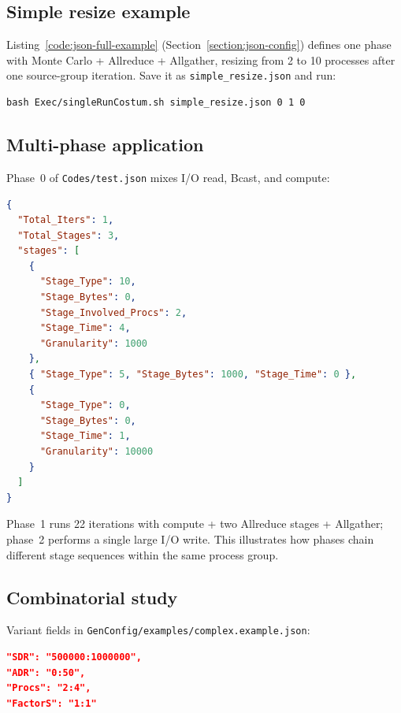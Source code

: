 \subsection{Simple resize example}

Listing~\ref{code:json-full-example} (Section~\ref{section:json-config}) defines one phase with Monte Carlo + Allreduce + Allgather, resizing from 2 to 10 processes after one source-group iteration. Save it as \texttt{simple\_resize.json} and run:

\begin{lstlisting}[style=bashstyle]
bash Exec/singleRunCostum.sh simple_resize.json 0 1 0
\end{lstlisting}

\subsection{Multi-phase application}

Phase~0 of \texttt{Codes/test.json} mixes I/O read, Bcast, and compute:

\begin{lstlisting}[language=json,caption={Phase 0 of Codes/test.json.},captionpos=b,label=code:json-phase-excerpt]
{
  "Total_Iters": 1,
  "Total_Stages": 3,
  "stages": [
    {
      "Stage_Type": 10,
      "Stage_Bytes": 0,
      "Stage_Involved_Procs": 2,
      "Stage_Time": 4,
      "Granularity": 1000
    },
    { "Stage_Type": 5, "Stage_Bytes": 1000, "Stage_Time": 0 },
    {
      "Stage_Type": 0,
      "Stage_Bytes": 0,
      "Stage_Time": 1,
      "Granularity": 10000
    }
  ]
}
\end{lstlisting}

Phase~1 runs 22 iterations with compute + two Allreduce stages + Allgather; phase~2 performs a single large I/O write. This illustrates how phases chain different stage sequences within the same process group.

\subsection{Combinatorial study}

Variant fields in \texttt{GenConfig/examples/complex.example.json}:

\begin{lstlisting}[language=json,caption={Variant fields in complex.example.json.},captionpos=b]
"SDR": "500000:1000000",
"ADR": "0:50",
"Procs": "2:4",
"FactorS": "1:1"
\end{lstlisting}

